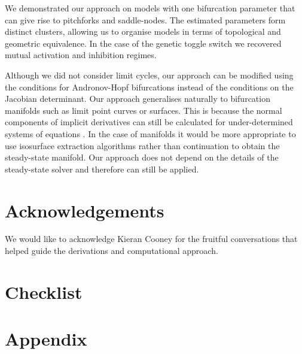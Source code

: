 We demonstrated our approach on models with one bifurcation parameter that can give rise to pitchforks and saddle-nodes. The estimated parameters form distinct clusters, allowing us to organise models in terms of topological and geometric equivalence. In the case of the genetic toggle switch we recovered mutual activation and inhibition regimes.

Although we did not consider limit cycles, our approach can be modified using the conditions for Andronov-Hopf bifurcations instead of the conditions on the Jacobian determinant. Our approach generalises naturally to bifurcation manifolds such as limit point curves or surfaces. This is because the normal components of implicit derivatives can still be calculated for under-determined systems of equations \cite{Jos2011OnSurface,Tao2016Near-IsometricTracking,Fujisawa2013CalculationInvariance}. In the case of manifolds it would be more appropriate to use isosurface extraction algorithms rather than continuation to obtain the steady-state manifold. Our approach does not depend on the details of the steady-state solver and therefore can still be applied.


\section{Acknowledgements}
We would like to acknowledge Kieran Cooney for the fruitful conversations that helped guide the derivations and computational approach.




\clearpage{}
\section*{Checklist}


\clearpage{}\setcounter{page}{1}
\section*{Appendix}
\appendix


